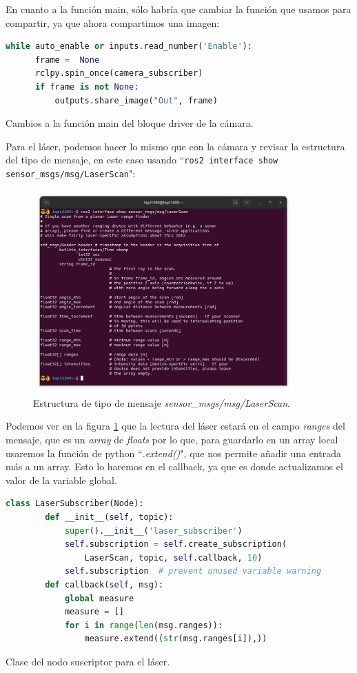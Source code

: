 En cuanto a la función main, sólo habría que cambiar la función que usamos para compartir, ya que ahora compartimos una imagen:
\begin{code}[H]
  \begin{lstlisting}[language=python]
  while auto_enable or inputs.read_number('Enable'):
      frame =  None
      rclpy.spin_once(camera_subscriber)
      if frame is not None:
          outputs.share_image("Out", frame)
  \end{lstlisting}
  \caption[Cambios main bloque cámara]{Cambios a la función main del bloque driver de la cámara.}
  \label{cod:cam_main_changes}
\end{code}
Para el láser, podemos hacer lo mismo que con la cámara y revisar la estructura del tipo de mensaje, en este caso usando ``\lstinline|ros2 interface show sensor_msgs/msg/LaserScan|":
\begin{figure} [H]
  \begin{center}
      \includegraphics[width=10cm]{figs/c4/laserscan_struct.png}
  \end{center}
  \caption[Estructura mensaje LaserScan]{Estructura de tipo de mensaje \textit{sensor\_msgs/msg/LaserScan}.}
  \label{fig:laserscan_struct}
\end{figure}
Podemos ver en la figura \ref{fig:laserscan_struct} que la lectura del láser estará en el campo \textit{ranges} del mensaje, que es un \textit{array}
de \textit{floats} por lo que, para guardarlo en un array local usaremos la función de python ``\textit{.extend()}", que nos permite añadir una entrada
más a un array. Esto lo haremos en el callback, ya que es donde actualizamos el valor de la variable global.
\begin{code}[H]
  \begin{lstlisting}[language=python]
    class LaserSubscriber(Node):
        def __init__(self, topic):
            super().__init__('laser_subscriber')
            self.subscription = self.create_subscription(
                LaserScan, topic, self.callback, 10)
            self.subscription  # prevent unused variable warning
        def callback(self, msg):
            global measure
            measure = []
            for i in range(len(msg.ranges)):
                measure.extend((str(msg.ranges[i]),))
  \end{lstlisting}
  \caption[Clase del nodo suscriptor para láser]{Clase del nodo suscriptor para el láser.}
  \label{cod:laser_node_class}
\end{code}
